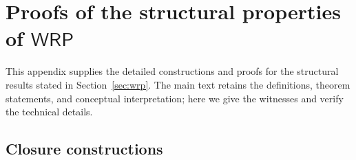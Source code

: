 \documentclass[11pt]{article}
\theoremstyle{definition}
\newcommand{\WRP}{\mathsf{WRP}}
\begin{document}
\clearpage
\appendix
\section[Proofs of the structural properties of WRP]{Proofs of the structural properties of $\WRP$}
\label{app:wrp-structural-proofs}

This appendix supplies the detailed constructions and proofs for the
structural results stated in Section~\ref{sec:wrp}.  The main text retains the
definitions, theorem statements, and conceptual interpretation; here we give
the witnesses and verify the technical details.

\subsection{Closure constructions}
\end{document}
